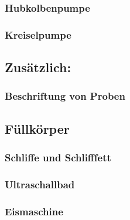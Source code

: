 \subsubsection{Hubkolbenpumpe}
\subsubsection{Kreiselpumpe}

\subsection{Zusätzlich:}
\subsubsection{Beschriftung von Proben}
\subsection{Füllkörper}
\subsubsection{\hypertarget{Normschliff}{Schliffe} und Schlifffett}
\label{sec:normschliff}
\subsubsection{Ultraschallbad}
\subsubsection{Eismaschine}